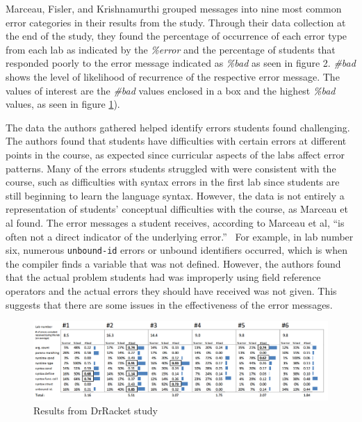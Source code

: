 \documentclass{sig-alternate}
\begin{document}


Marceau, Fisler, and Krishnamurthi grouped messages into nine most common error categories in their results from the study.
Through their data collection at the end of the study, they found the percentage of occurrence of each error type from each lab as indicated by the \textit{\%error} and the percentage of students that responded poorly to the error message indicated as \textit{\%bad} as seen in figure 2.
\textit{\#bad} shows the level of likelihood of recurrence of the respective error message.
The values of interest are the \textit{\#bad} values enclosed in a box and the highest \textit{\%bad} values, as seen in figure \ref{fig:drracketstudy}). 

The data the authors gathered helped identify errors students found challenging.
The authors found that students have difficulties with certain errors at different points in the course, as expected since curricular aspects of the labs affect error patterns.
Many of the errors students struggled with were consistent with the course, such as difficulties with syntax errors in the first lab since students are still beginning to learn the language syntax.
However, the data is not entirely a representation of students' conceptual difficulties with the course, as Marceau et al found.
The error messages a student receives, according to Marceau et al, ``is often not a direct indicator of the underlying error.''~\cite{Marceau:2011:MEE:1953163.1953308}
For example, in lab number six, numerous \texttt{unbound-id} errors  or unbound identifiers occurred, which is when the compiler finds a variable that was not defined.
However, the authors found that the actual problem students had was improperly using field reference operators and the actual errors they should have received was not given.
This suggests that there are some issues in the effectiveness of the error messages.

\begin{figure}
  \centering
  \includegraphics[keepaspectratio, width=\textwidth]{MEE_Data.png}
  \caption{Results from DrRacket study}
  \label{fig:drracketstudy}
\end{figure}
\end{document}
